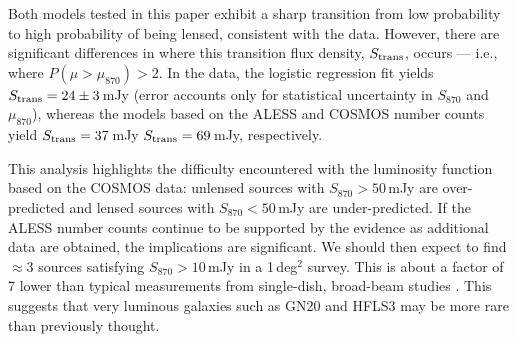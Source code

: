 \documentclass[iop]{emulateapj}
\begin{document}

Both models tested in this paper exhibit a sharp transition from low
probability to high probability of being lensed, consistent with the data.
However, there are significant differences in where this transition flux
density, $S_{\rm trans}$, occurs --- i.e., where $P(\mu>\mu_{870}) > 2$.  In
the data, the logistic regression fit yields $S_{\rm trans} = 24\pm3\,$mJy
(error accounts only for statistical uncertainty in $S_{870}$ and $\mu_{870}$),
whereas the models based on the ALESS and COSMOS number counts yield
$S_{\rm trans} = 37\,$mJy $S_{\rm trans} = 69\,$mJy, respectively. 

This analysis highlights the difficulty encountered with the luminosity
function based on the COSMOS data: unlensed sources with $S_{870} > 50\,$mJy
are over-predicted and lensed sources with $S_{870} < 50\,$mJy are
under-predicted.  If the ALESS number counts continue to be supported by
the evidence as additional data are obtained, the implications are significant.
We should then expect to find $\approx 3$ sources satisfying $S_{870} >
10\,$mJy in a 1$\,$deg$^2$ survey.  This is about a factor of 7 lower than
typical measurements from single-dish, broad-beam studies
\citep[e.g.,][]{Weis:2009ly}.  This suggests that very luminous galaxies such
as GN20 and HFLS3 may be more rare than previously thought.
\end{document}
